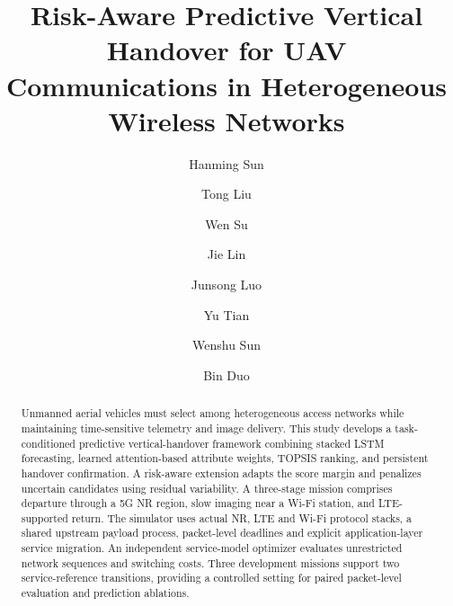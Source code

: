 \documentclass[preprint,12pt]{elsarticle}
\begin{document}
\begin{frontmatter}

\title{Risk-Aware Predictive Vertical Handover for UAV Communications in Heterogeneous Wireless Networks}

\author[jnu]{Hanming Sun}

\author[cdut]{Tong Liu}

\author[cdut]{Wen Su}

\author[cdut]{Jie Lin}

\author[cdut]{Junsong Luo}

\author[jniit]{Yu Tian}

\author[jniit]{Wenshu Sun}

\author[cdut]{Bin Duo}





\begin{abstract}
Unmanned aerial vehicles must select among heterogeneous access networks while maintaining time-sensitive telemetry and image delivery. This study develops a task-conditioned predictive vertical-handover framework combining stacked LSTM forecasting, learned attention-based attribute weights, TOPSIS ranking, and persistent handover confirmation. A risk-aware extension adapts the score margin and penalizes uncertain candidates using residual variability. A three-stage mission comprises departure through a 5G NR region, slow imaging near a Wi-Fi station, and LTE-supported return. The simulator uses actual NR, LTE and Wi-Fi protocol stacks, a shared upstream payload process, packet-level deadlines and explicit application-layer service migration. An independent service-model optimizer evaluates unrestricted network sequences and switching costs. Three development missions support two service-reference transitions, providing a controlled setting for paired packet-level evaluation and prediction ablations.
\end{abstract}


\end{frontmatter}
\end{document}
